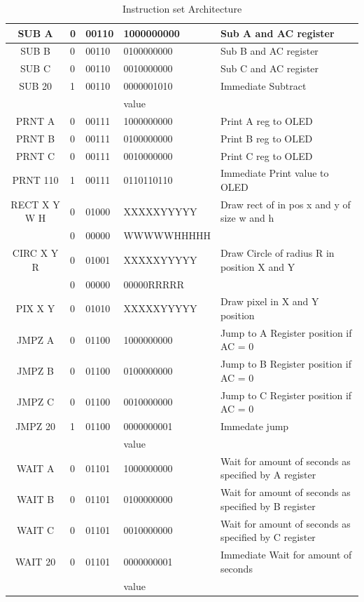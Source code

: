\documentclass[a4paper,12pt]{article}
\begin{document}
\begin{table}[h]
{\begin{tabular}{|c|l|l|l|p{6cm}|}
    SUB A & 0 & 00110 & 1000000000 & Sub A and AC register\\ \hline
    SUB B & 0 & 00110 & 0100000000 & Sub B and AC register\\ \hline
    SUB C & 0 & 00110 & 0010000000 & Sub C and AC register\\ \hline
    SUB 20 & 1 & 00110 & 0000001010 & Immediate Subtract\\ 
    &  &  & value  & \\ \hline
    PRNT A & 0 & 00111 & 1000000000 & Print A reg to OLED \\ \hline
    PRNT B & 0 & 00111 & 0100000000 & Print B reg to OLED \\ \hline
    PRNT C & 0 & 00111 & 0010000000 & Print C reg to OLED\\ \hline
    PRNT 110 & 1 & 00111 & 0110110110 & Immediate Print value to OLED\\ \hline
    RECT X Y W H & 0 & 01000 & XXXXXYYYYY & Draw rect of in pos x and y of size w and h\\ 
    & 0 & 00000 & WWWWWHHHHH &\\ \hline 
    CIRC X Y R & 0 & 01001 & XXXXXYYYYY & Draw Circle of radius R in position X and Y\\ 
    & 0 & 00000 & 00000RRRRR & \\ \hline
    PIX X Y & 0 & 01010 & XXXXXYYYYY & Draw pixel in X and Y position\\ \hline
    JMPZ A & 0 & 01100 & 1000000000 & Jump to A Register position if AC = 0\\ \hline
    JMPZ B & 0 & 01100 & 0100000000 & Jump to B Register position if AC = 0\\ \hline
    JMPZ C & 0 & 01100 & 0010000000 & Jump to C Register position if AC = 0\\ \hline
    JMPZ 20 & 1 & 01100 & 0000000001 & Immedate jump \\ 
    &  &  & value  & \\ \hline
    WAIT A & 0 & 01101 & 1000000000 & Wait for amount of seconds as specified by A register\\ \hline
    WAIT B & 0 & 01101 & 0100000000 &  Wait for amount of seconds as specified by B register\\ \hline
    WAIT C & 0 & 01101 & 0010000000 &  Wait for amount of seconds as specified by C register\\ \hline
    WAIT 20 & 0 & 01101 & 0000000001 &  Immediate Wait for amount of seconds \\ 
    &  &  & value  & \\ \hline
    \end{tabular}
    }
    \caption{Instruction set Architecture}
    \end{table}
\end{document}
